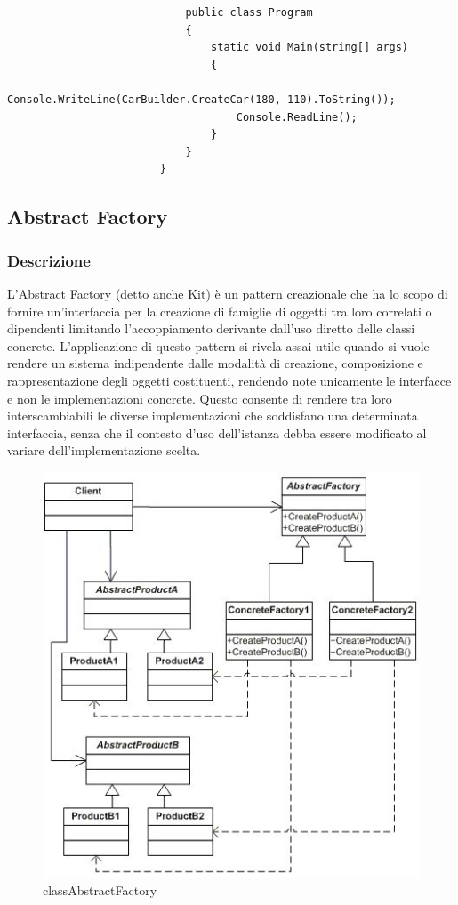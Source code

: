\documentclass[a4paper,10pt]{article}
\begin{document}
\begin{lstlisting}
                            public class Program
                            {
                                static void Main(string[] args)
                                {
                                    Console.WriteLine(CarBuilder.CreateCar(180, 110).ToString());
                                    Console.ReadLine();
                                }
                            }
                        }
                    \end{lstlisting}
                    \newpage
                    \subsection{Abstract Factory}
                    \subsubsection{Descrizione}
                    L’Abstract Factory (detto anche Kit) è un pattern creazionale che ha lo scopo di fornire un’interfaccia per la creazione di famiglie di oggetti tra loro correlati o dipendenti limitando l’accoppiamento derivante dall’uso diretto delle classi concrete. L’applicazione di questo pattern si rivela assai utile quando si vuole rendere un sistema indipendente dalle modalità di creazione, composizione e rappresentazione degli oggetti costituenti, rendendo note unicamente le interfacce e non le implementazioni concrete. Questo consente di rendere tra loro interscambiabili le diverse implementazioni che soddisfano una determinata interfaccia, senza che il contesto d’uso dell’istanza debba essere modificato al variare dell’implementazione scelta.
    
                    \begin{figure}[h!] %
                        \centering
                        \includegraphics[scale=0.50]{img/IC92016}
                        \caption{classAbstractFactory}
                    \end{figure}
        
\end{document}
